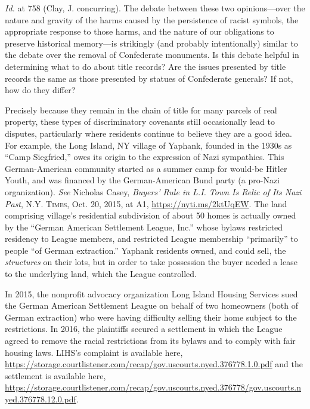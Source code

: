 \textit{Id.} at 758 (Clay, J. concurring). The debate between these two
opinions---over the nature and gravity of the harms caused by the persistence of
racist symbols, the appropriate response to those harms, and the nature of our
obligations to preserve historical memory---is strikingly (and probably
intentionally) similar to the debate over the removal of Confederate monuments.
Is this debate helpful in determining what to do about title records? Are the
issues presented by title records the same as those presented by statues of
Confederate generals? If not, how do they differ?


\item Precisely because they remain in the chain of title for many parcels of
real property, these types of discriminatory covenants still occasionally lead
to disputes, particularly where residents continue to believe they are a good
idea. For example, the Long Island, NY village of Yaphank, founded in the 1930s
as ``Camp Siegfried,'' owes its origin to the expression of Nazi sympathies.
This German-American community started as a summer camp for would-be Hitler
Youth, and was financed by the German-American Bund party (a pro-Nazi
organization). \textit{See} Nicholas Casey, \textit{Buyers' Rule in L.I. Town Is
Relic of Its Nazi Past}, \textsc{N.Y. Times}, Oct. 20, 2015, at A1,
\url{https://nyti.ms/2ktUqEW}. The land comprising village's residential
subdivision of about 50 homes is actually owned by the ``German American
Settlement League, Inc.'' whose bylaws restricted residency to League members,
and restricted League membership ``primarily'' to people ``of German
extraction.'' Yaphank residents owned, and could sell, the \textit{structures}
on their lots, but in order to take possession the buyer needed a lease to the
underlying land, which the League controlled.

In 2015, the nonprofit advocacy organization Long Island Housing Services sued
the German American Settlement League on behalf of two homeowners (both of
German extraction) who were having difficulty selling their home subject to the
restrictions. In 2016, the plaintiffs secured a settlement in which the League
agreed to remove the racial restrictions from its bylaws and to comply with fair
housing laws. LIHS's complaint is available here,
\url{https://storage.courtlistener.com/recap/gov.uscourts.nyed.376778.1.0.pdf}
and the settlement is available here,
\url{https://storage.courtlistener.com/recap/gov.uscourts.nyed.376778/gov.uscourts.nyed.376778.12.0.pdf}.


